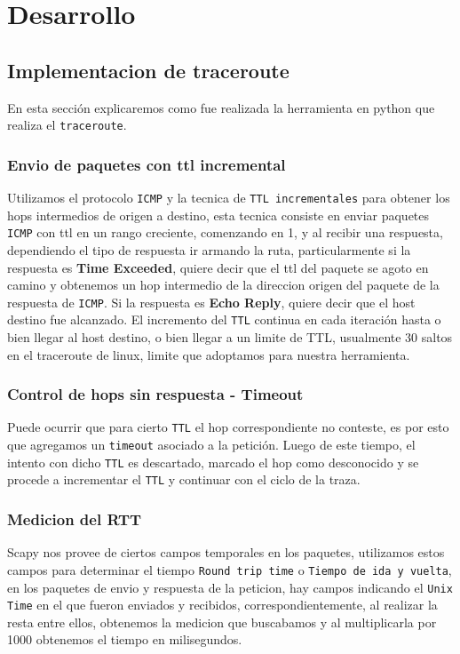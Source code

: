 \section{Desarrollo}
\subsection{Implementacion de traceroute}
En esta sección explicaremos como fue realizada la herramienta en python que realiza el \texttt{traceroute}.
\subsubsection{Envio de paquetes con ttl incremental}
Utilizamos el protocolo \texttt{ICMP} y la tecnica de \texttt{TTL incrementales} para obtener los hops intermedios de origen a destino, esta tecnica consiste en enviar paquetes \texttt{ICMP} con ttl en un rango creciente, comenzando en 1, y al recibir una respuesta, dependiendo el tipo de respuesta ir armando la ruta, particularmente si la respuesta es \textbf{Time Exceeded}, quiere decir que el ttl del paquete se agoto en camino y obtenemos un hop intermedio de la direccion origen del paquete de la respuesta de \texttt{ICMP}. Si la respuesta es \textbf{Echo Reply}, quiere decir que el host destino fue alcanzado. El incremento del \texttt{TTL} continua en cada iteración hasta o bien llegar al host destino, o bien llegar a un limite de TTL, usualmente 30 saltos en el traceroute de linux, limite que adoptamos para nuestra herramienta.
\subsubsection{Control de hops sin respuesta - Timeout}
Puede ocurrir que para cierto \texttt{TTL} el hop correspondiente no conteste, es por esto que agregamos un \texttt{timeout} asociado a la petici\'on. Luego de este tiempo, el intento con dicho \texttt{TTL} es descartado, marcado el hop como desconocido y se procede a incrementar el \texttt{TTL} y continuar con el ciclo de la traza.
\subsubsection{Medicion del RTT}
Scapy nos provee de ciertos campos temporales en los paquetes, utilizamos estos campos para determinar el tiempo \texttt{Round trip time} o \texttt{Tiempo de ida y vuelta}, en los paquetes de envio y respuesta de la peticion, hay campos indicando el \texttt{Unix Time} en el que fueron enviados y recibidos, correspondientemente, al realizar la resta entre ellos, obtenemos la medicion que buscabamos y al multiplicarla por 1000 obtenemos el tiempo en milisegundos.

